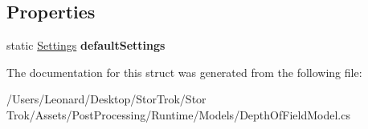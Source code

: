 \subsection*{Properties}
\begin{DoxyCompactItemize}
\item 
\mbox{\label{struct_unity_engine_1_1_post_processing_1_1_depth_of_field_model_1_1_settings_a33cabc314b2e0327ed8a4927d61d4feb}} 
static \hyperlink{struct_unity_engine_1_1_post_processing_1_1_depth_of_field_model_1_1_settings}{Settings} {\bfseries default\+Settings}
\end{DoxyCompactItemize}


The documentation for this struct was generated from the following file\+:\begin{DoxyCompactItemize}
\item 
/\+Users/\+Leonard/\+Desktop/\+Stor\+Trok/\+Stor Trok/\+Assets/\+Post\+Processing/\+Runtime/\+Models/Depth\+Of\+Field\+Model.\+cs\end{DoxyCompactItemize}

